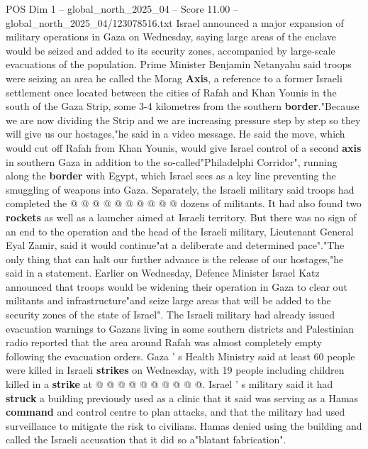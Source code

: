 \begin{textsample}{POS Dim 1 – global\_north\_2025\_04 – Score 11.00 – global\_north\_2025\_04/123078516.txt}  \label{ex:f1_pos_419}
Israel announced a major expansion of military operations in Gaza on Wednesday, saying large areas of the enclave would be seized and added to its security zones, accompanied by large-scale evacuations of the population.
Prime Minister Benjamin Netanyahu said troops were seizing an area he called the Morag \textbf{Axis}, a reference to a former Israeli settlement once located between the cities of Rafah and Khan Younis in the south of the Gaza Strip, some 3-4 kilometres from the southern \textbf{border}."Because we are now dividing the Strip and we are increasing pressure step by step so they will give us our hostages,"he said in a video message.
He said the move, which would cut off Rafah from Khan Younis, would give Israel control of a second \textbf{axis} in southern Gaza in addition to the so-called"Philadelphi Corridor", running along the \textbf{border} with Egypt, which Israel sees as a key line preventing the smuggling of weapons into Gaza.
Separately, the Israeli military said troops had completed the @ @ @ @ @ @ @ @ @ @ dozens of militants.
It had also found two \textbf{rockets} as well as a launcher aimed at Israeli territory.
But there was no sign of an end to the operation and the head of the Israeli military, Lieutenant General Eyal Zamir, said it would continue"at a deliberate and determined pace"."The only thing that can halt our further advance is the release of our hostages,"he said in a statement.
Earlier on Wednesday, Defence Minister Israel Katz announced that troops would be widening their operation in Gaza to clear out militants and infrastructure"and seize large areas that will be added to the security zones of the state of Israel".
The Israeli military had already issued evacuation warnings to Gazans living in some southern districts and Palestinian radio reported that the area around Rafah was almost completely empty following the evacuation orders.
Gaza ' s Health Ministry said at least 60 people were killed in Israeli \textbf{strikes} on Wednesday, with 19 people including children killed in a \textbf{strike} at @ @ @ @ @ @ @ @ @ @.
Israel ' s military said it had \textbf{struck} a building previously used as a clinic that it said was serving as a Hamas \textbf{command} and control centre to plan attacks, and that the military had used surveillance to mitigate the risk to civilians.
Hamas denied using the building and called the Israeli accusation that it did so a"blatant fabrication".

\end{textsample}
